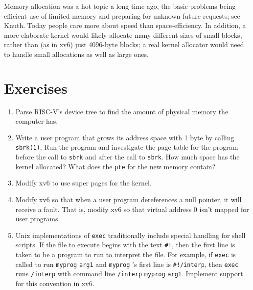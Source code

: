 Memory allocation was a hot topic a long time ago, the basic problems being
efficient use of limited memory and
preparing for unknown future requests;
see Knuth.  Today people care more about speed than
space-efficiency.  In addition, a more elaborate kernel
would likely allocate many different sizes of small blocks,
rather than (as in xv6) just 4096-byte blocks;
a real kernel
allocator would need to handle small allocations as well as large
ones.
\section{Exercises}

\begin{enumerate}
  
\item Parse RISC-V's device tree to find the amount of physical memory
the computer has.

\item Write a user program that grows its address space with 1 byte by calling
\lstinline{sbrk(1)}.
Run the  program and investigate the page table for the program before the call
to
\lstinline{sbrk}
and after the call to
\lstinline{sbrk}.
How much space has the kernel allocated?  What does the
\lstinline{pte}
for the new memory contain?

\item Modify xv6 to use super pages for the kernel.

\item Modify xv6 so that when a user program dereferences a null pointer, it will
receive a fault.  That is, modify xv6 so that virtual address 0 isn't mapped for
user programs.

\item Unix implementations of
\lstinline{exec}
traditionally include special handling for shell scripts.
If the file to execute begins with the text
\lstinline{#!},
then the first line is taken to be a program
to run to interpret the file.
For example, if
\lstinline{exec}
is called to run
\lstinline{myprog}
\lstinline{arg1}
and
\lstinline{myprog} 's
first line is
\lstinline{#!/interp},
then
\lstinline{exec}
runs
\lstinline{/interp}
with command line
\lstinline{/interp}
\lstinline{myprog}
\lstinline{arg1}.
Implement support for this convention in xv6.

\end{enumerate}

